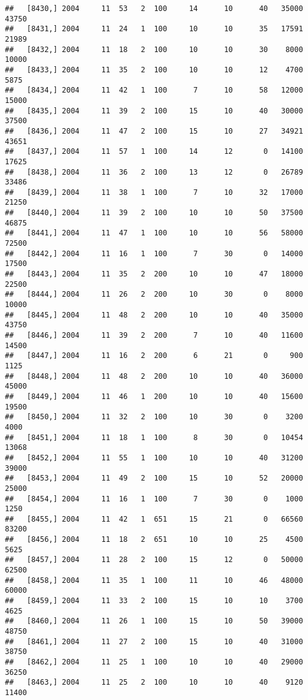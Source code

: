 \documentclass{article}\usepackage[]{graphicx}\usepackage[]{color}
\makeatletter
\newenvironment{kframe}{%
 \def\at@end@of@kframe{}%
 \ifinner\ifhmode%
  \def\at@end@of@kframe{\end{minipage}}%
  \begin{minipage}{\columnwidth}%
 \fi\fi%
 \def\FrameCommand##1{\hskip\@totalleftmargin \hskip-\fboxsep
 \colorbox{shadecolor}{##1}\hskip-\fboxsep
     \hskip-\linewidth \hskip-\@totalleftmargin \hskip\columnwidth}%
 \MakeFramed {\advance\hsize-\width
   \@totalleftmargin\z@ \linewidth\hsize
   \@setminipage}}%
 {\par\unskip\endMakeFramed%
 \at@end@of@kframe}
\newenvironment{knitrout}{}{} %
\makeatother
\begin{document}
\begin{knitrout}
\begin{kframe}
\begin{verbatim}
##   [8430,] 2004     11  53   2  100     14      10      40   35000   43750
##   [8431,] 2004     11  24   1  100     10      10      35   17591   21989
##   [8432,] 2004     11  18   2  100     10      10      30    8000   10000
##   [8433,] 2004     11  35   2  100     10      10      12    4700    5875
##   [8434,] 2004     11  42   1  100      7      10      58   12000   15000
##   [8435,] 2004     11  39   2  100     15      10      40   30000   37500
##   [8436,] 2004     11  47   2  100     15      10      27   34921   43651
##   [8437,] 2004     11  57   1  100     14      12       0   14100   17625
##   [8438,] 2004     11  36   2  100     13      12       0   26789   33486
##   [8439,] 2004     11  38   1  100      7      10      32   17000   21250
##   [8440,] 2004     11  39   2  100     10      10      50   37500   46875
##   [8441,] 2004     11  47   1  100     10      10      56   58000   72500
##   [8442,] 2004     11  16   1  100      7      30       0   14000   17500
##   [8443,] 2004     11  35   2  200     10      10      47   18000   22500
##   [8444,] 2004     11  26   2  200     10      30       0    8000   10000
##   [8445,] 2004     11  48   2  200     10      10      40   35000   43750
##   [8446,] 2004     11  39   2  200      7      10      40   11600   14500
##   [8447,] 2004     11  16   2  200      6      21       0     900    1125
##   [8448,] 2004     11  48   2  200     10      10      40   36000   45000
##   [8449,] 2004     11  46   1  200     10      10      40   15600   19500
##   [8450,] 2004     11  32   2  100     10      30       0    3200    4000
##   [8451,] 2004     11  18   1  100      8      30       0   10454   13068
##   [8452,] 2004     11  55   1  100     10      10      40   31200   39000
##   [8453,] 2004     11  49   2  100     15      10      52   20000   25000
##   [8454,] 2004     11  16   1  100      7      30       0    1000    1250
##   [8455,] 2004     11  42   1  651     15      21       0   66560   83200
##   [8456,] 2004     11  18   2  651     10      10      25    4500    5625
##   [8457,] 2004     11  28   2  100     15      12       0   50000   62500
##   [8458,] 2004     11  35   1  100     11      10      46   48000   60000
##   [8459,] 2004     11  33   2  100     15      10      10    3700    4625
##   [8460,] 2004     11  26   1  100     15      10      50   39000   48750
##   [8461,] 2004     11  27   2  100     15      10      40   31000   38750
##   [8462,] 2004     11  25   1  100     10      10      40   29000   36250
##   [8463,] 2004     11  25   2  100     10      10      40    9120   11400

\end{verbatim}
\end{kframe}
\end{knitrout}
\end{document}

